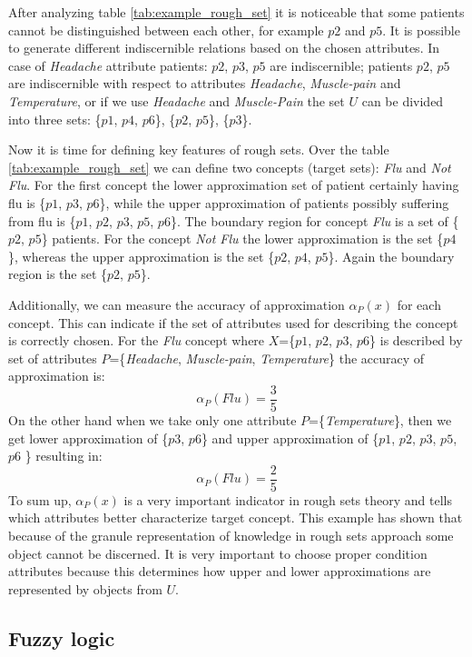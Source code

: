 After analyzing table \ref{tab:example_rough_set} it is noticeable that some
patients cannot be distinguished between each other, for example $p2$ and $p5$.
It is possible to generate different indiscernible relations based on 
the chosen attributes. In case of \textit{Headache} attribute patients: $p2$,
$p3$, $p5$ are indiscernible; patients $p2$, $p5$ are
indiscernible with respect to attributes \textit{Headache},
\textit{Muscle-pain} and \textit{Temperature}, or if we use \textit{Headache}
and \textit{Muscle-Pain} the set $U$ can be divided into three sets:
\{$p1$, $p4$, $p6$\}, \{$p2$, $p5$\}, \{$p3$\}.

Now it is time for defining key features of rough sets. Over the table
\ref{tab:example_rough_set} we can define two concepts (target sets):
\textit{Flu} and \textit{Not Flu}. For the first concept the lower approximation
set of patient certainly having flu is \{$p1$, $p3$, $p6$\}, while the upper
approximation of patients possibly suffering from flu is \{$p1$, $p2$, $p3$,
$p5$, $p6$\}. The boundary region for concept \textit{Flu} is a set of \{$p2$, $p5$\} 
patients. For the concept \textit{Not Flu} the lower approximation is the set
\{$p4$\}, whereas the upper approximation is the set \{$p2$, $p4$, $p5$\}. Again the 
boundary region is the set \{$p2$, $p5$\}.

Additionally, we can measure the accuracy of approximation $\alpha_P(x)$ for each concept.
This can indicate if the set of attributes used for describing the concept is correctly
chosen. For the \textit{Flu} concept where $X$=\{$p1$, $p2$, $p3$, $p6$\} is described by
set of attributes $P$=\{\textit{Headache}, \textit{Muscle-pain},
\textit{Temperature}\} the accuracy of approximation is:
$$\alpha_P(Flu) = \frac{3}{5}$$
On the other hand when we take only one attribute $P$=\{\textit{Temperature}\}, then we get lower approximation of 
\{$p3$, $p6$\} and upper approximation of \{$p1$, $p2$, $p3$, $p5$, $p6$ \}
resulting in:
$$\alpha_P(Flu) = \frac{2}{5}$$
To sum up, $\alpha_P(x)$ is a very important indicator in
rough sets theory and tells which attributes better characterize target
concept. This example has shown that because of the granule representation of
knowledge in rough sets approach some object cannot be discerned. It is very
important to choose proper condition attributes because this determines how
upper and lower approximations are represented by objects from $U$. 


\subsection{Fuzzy logic}
\label{cha:Fuzzy_logic}
